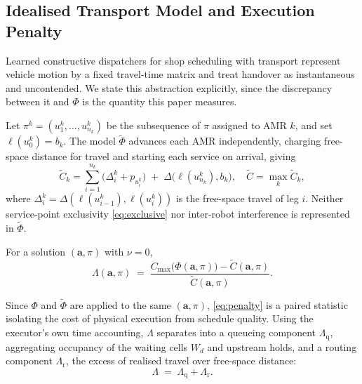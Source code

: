 \subsection{Idealised Transport Model and Execution Penalty}
\label{sec:penalty}

Learned constructive dispatchers for shop scheduling with transport
represent vehicle motion by a fixed travel-time matrix and treat handover as
instantaneous and uncontended. We state this abstraction explicitly, since
the discrepancy between it and $\Phi$ is the quantity this paper measures.

\begin{definition}
\label{def:ideal}
Let $\pi^{k}=(u^{k}_{1},\dots,u^{k}_{n_k})$ be the subsequence of $\pi$
assigned to AMR $k$, and set $\ell(u^{k}_{0})=b_k$. The model
$\tilde{\Phi}$ advances each AMR independently, charging free-space distance
for travel and starting each service on arrival, giving
\begin{equation}
\tilde{C}_k = \sum_{i=1}^{n_k} \big(\Delta^{k}_{i} + p_{u^{k}_{i}}\big)
\;+\; \Delta\big(\ell(u^{k}_{n_k}),b_k\big),
\quad
\tilde{C} = \max_{k} \tilde{C}_k,
\label{eq:ideal}
\end{equation}
where $\Delta^{k}_{i}=\Delta(\ell(u^{k}_{i-1}),\ell(u^{k}_{i}))$ is the
free-space travel of leg $i$.
Neither service-point exclusivity \eqref{eq:exclusive} nor inter-robot
interference is represented in $\tilde{\Phi}$.
\end{definition}

\begin{definition}
\label{def:penalty}
For a solution $(\bm{a},\pi)$ with $\nu=0$,
\begin{equation}
\Lambda(\bm{a},\pi) \;=\;
\frac{C_{\max}\big(\Phi(\bm{a},\pi)\big) - \tilde{C}(\bm{a},\pi)}
     {\tilde{C}(\bm{a},\pi)} .
\label{eq:penalty}
\end{equation}
\end{definition}

Since $\Phi$ and $\tilde{\Phi}$ are applied to the same $(\bm{a},\pi)$,
\eqref{eq:penalty} is a paired statistic isolating the cost of physical
execution from schedule quality. Using the executor's own time accounting,
$\Lambda$ separates into a queueing component $\Lambda_{\mathrm{q}}$,
aggregating occupancy of the waiting cells $W_d$ and upstream holds, and a
routing component $\Lambda_{\mathrm{r}}$, the excess of realised travel over
free-space distance:
\begin{equation}
\Lambda \;=\; \Lambda_{\mathrm{q}} + \Lambda_{\mathrm{r}} .
\label{eq:decomp}
\end{equation}

